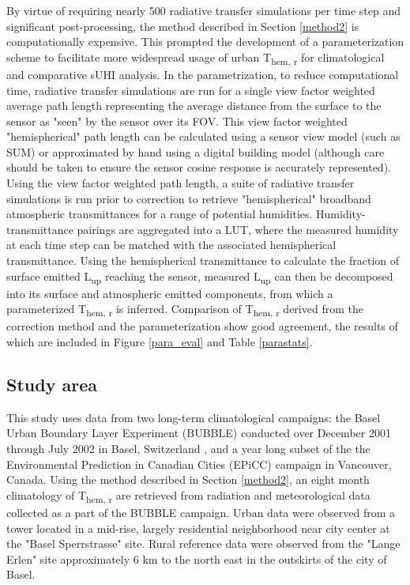 \begin{bibunit}
By virtue of requiring nearly 500 radiative transfer simulations per time step and significant post-processing, the method described in Section \ref{method2} is computationally expensive. This prompted the development of a parameterization scheme to facilitate more widespread usage of urban T\textsubscript{hem, r} for climatological and comparative sUHI analysis. In the parametrization, to reduce computational time, radiative transfer simulations are run for a single view factor weighted average path length representing the average distance from the surface to the sensor as "seen" by the sensor over its FOV. This view factor weighted "hemispherical" path length can be calculated using a sensor view model (such as SUM) or approximated by hand using a digital building model (although care should be taken to ensure the sensor cosine response is accurately represented). Using the view factor weighted path length, a suite of radiative transfer simulations is run prior to correction to retrieve "hemispherical" broadband atmospheric transmittances for a range of potential humidities. Humidity-transmittance pairings are aggregated into a LUT, where the measured humidity at each time step can be matched with the associated hemispherical transmittance. Using the hemispherical transmittance to calculate the fraction of surface emitted L\textsubscript{up} reaching the sensor, measured L\textsubscript{up} can then be decomposed into its surface and atmospheric emitted components, from which a parameterized T\textsubscript{hem, r} is inferred. Comparison of T\textsubscript{hem, r} derived from the correction method and the parameterization show good agreement, the results of which are included in Figure \ref{para_eval} and Table \ref{parastats}.

\subsection{Study area}

This study uses data from two long-term climatological campaigns: the Basel Urban Boundary Layer Experiment (BUBBLE) conducted over December 2001 through July 2002 in Basel, Switzerland \citep{Rotach2005}, and a year long subset of the the Environmental Prediction in Canadian Cities (EPiCC) \citep{Voogt2007} campaign in Vancouver, Canada. Using the method described in Section \ref{method2}, an eight month climatology of T\textsubscript{hem, r} are retrieved from radiation and meteorological data collected as a part of the BUBBLE campaign. Urban data were observed from a tower located in a mid-rise, largely residential neighborhood near city center at the "Basel Sperrstrasse" site. Rural reference data were observed from the "Lange Erlen" site approximately 6 \si{\kilo\meter} to the north east in the outskirts of the city of Basel. 


\end{bibunit}
